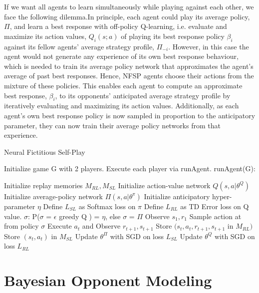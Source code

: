 \documentclass{article}
\newlength\myindent
\newcommand\bindent{%
  \begingroup
  \setlength{\itemindent}{\myindent}
  \addtolength{\algorithmicindent}{\myindent}
}
\newcommand\eindent{\endgroup}
\begin{document}
If we want all agents to learn simultaneously while playing against each other, we face the following
dilemma.In principle, each agent could play its average policy, $\Pi$, and learn a best response with off-policy Q-learning, i.e. evaluate and maximize its action values, $Q_i(s; a)$ of playing its best response policy $\beta_i$ against its fellow agents’ average strategy profile, $\Pi_{-i}$. However, in this case the agent would not generate any experience of its own best response behaviour, which is needed to train its average policy network that approximates the agent’s average of past best responses. Hence, NFSP agents choose their actions from the mixture of these policies. This enables each agent to compute an approximate best response, $\beta_i$, to its opponents’ anticipated average strategy profile by iteratively evaluating and maximizing its action values. Additionally, as each agent’s own best response policy is now sampled in proportion to the anticipatory parameter, they can now train their average policy networks from that experience.
\begin{algorithm}
   \caption{Neural Fictitious Self-Play}
   \label{alg:example}
   \begin{algorithmic}
   \STATE Initialize game G with 2 players. 
   \STATE Execute each player via runAgent.
    runAgent(G): 
   \bindent
   \STATE Initialize replay memories $M_{RL}, M_{SL}$ 
   \STATE Initialize action-value network $Q(s,a|\theta^Q)$
   \STATE Initialize average-policy network $\Pi(s,a|\theta^{\pi})$
   \STATE Initialize anticipatory hyper-parameter $\eta$  
   \STATE Define ${L_{SL}}$ as Softmax loss on $\pi$
   \STATE Define ${L_{RL}}$ as TD Error loss on Q value.
   \STATE $\sigma $: P($\sigma$ = $\epsilon$ greedy Q ) = $\eta$, else $\sigma$ = $\Pi$ 
   \STATE Observe $s_1, r_1$
   \STATE Sample action at from policy $\sigma$
   \STATE Execute $a_t$ and Observe $r_{t+1},s_{t+1}$
   \STATE Store $(s_t,a_t,r_{t+1},s_{t+1}$ in $M_{RL})$
   \STATE Store $(s_t,a_t)$ in $M_{SL}$
   \ENDIF
   \STATE Update $\theta^{\Pi}$ with SGD on loss $L_{SL}$
   \STATE Update $\theta^{Q}$ with SGD on loss $L_{RL}$ 
   \ENDFOR
   \ENDFOR
   \eindent
  
   \end{algorithmic}
\end{algorithm}
\section{Bayesian Opponent Modeling}
\end{document}
